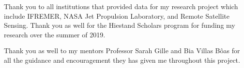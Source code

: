 \documentclass[draft,linenumbers]{agujournal2018}
\begin{document}
%




%
%
%
%
%
%
%
%


\acknowledgments
 Thank you to all institutions that provided data for my research project which include IFREMER, NASA Jet Propulsion Laboratory, and Remote Satellite Sensing. Thank you as well for the Hiestand Scholars program for funding my research over the summer of 2019.
 
 \noindent Thank you as well to my mentors Professor Sarah Gille and Bia Villas B\^oas for all the guidance and encouragement they has given me throughout this project. 


%


%





\end{document}
